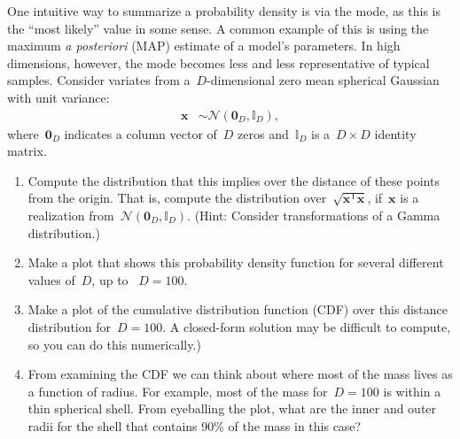 \documentclass[submit]{harvardml}
\newcommand{\trans}{\mathsf{T}}
\newcommand{\bx}{\mathbf{x}}
\newcommand{\distNorm}{\mathcal{N}}
\newcommand{\bzero}{\mathbf{0}}
\newcommand{\ident}{\mathbb{I}}
\begin{document}
\begin{problem}[10pts]
One intuitive way to summarize a probability density is via the mode,
as this is the ``most likely'' value in some sense.  A common example
of this is using the maximum \textit{a posteriori} (MAP) estimate of a
model's parameters.  In high dimensions, however, the mode becomes
less and less representative of typical samples.  Consider variates
from a~$D$-dimensional zero mean spherical Gaussian with unit
variance:
\begin{align*}
  \bx &\sim \distNorm(\bzero_D, \ident_D),
\end{align*}
where~$\bzero_D$ indicates a column vector of~$D$ zeros and~$\ident_D$
is a~${D\times D}$ identity matrix.
\begin{enumerate}
  \item Compute the distribution that this implies over the distance
    of these points from the origin.  That is, compute the
    distribution over~$\sqrt{\bx^\trans\bx}$, if~$\bx$ is a
    realization from~$\distNorm(\bzero_D, \ident_D)$.  (Hint: Consider
    transformations of a Gamma distribution.)
  \item Make a plot that shows this probability density function for
    several different values of~$D$, up to ~${D=100}$.

  \item Make a plot of the cumulative distribution function (CDF) over
    this distance distribution for~${D=100}$.  A closed-form solution
    may be difficult to compute, so you can do this numerically.)

  \item From examining the CDF we can think about where most of the
    mass lives as a function of radius.  For example, most of the mass
    for~${D=100}$ is within a thin spherical shell.  From eyeballing
    the plot, what are the inner and outer radii for the shell that
    contains 90\% of the mass in this case?
\end{enumerate}
\end{problem}
\end{document}
